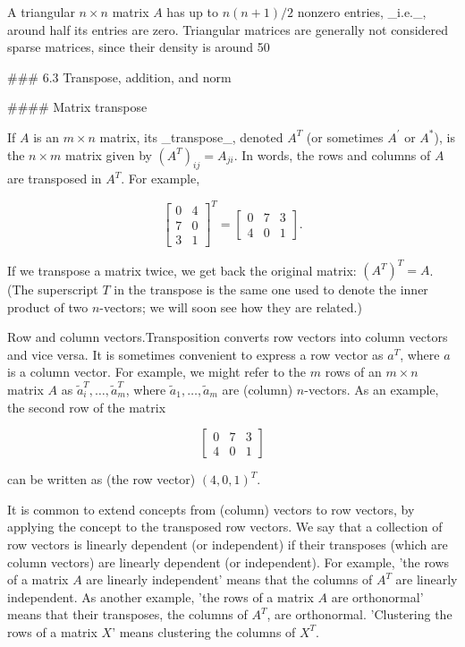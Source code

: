 A triangular \(n\times n\) matrix \(A\) has up to \(n(n+1)/2\) nonzero entries, _i.e._, around half its entries are zero. Triangular matrices are generally not considered sparse matrices, since their density is around 50%

### 6.3 Transpose, addition, and norm

#### Matrix transpose

If \(A\) is an \(m\times n\) matrix, its _transpose_, denoted \(A^{T}\) (or sometimes \(A^{\prime}\) or \(A^{*}\)), is the \(n\times m\) matrix given by \((A^{T})_{ij}=A_{ji}\). In words, the rows and columns of \(A\) are transposed in \(A^{T}\). For example,

\[\left[\begin{array}{cc}0&4\\ 7&0\\ 3&1\end{array}\right]^{T}=\left[\begin{array}{cc}0&7&3\\ 4&0&1\end{array}\right].\]

If we transpose a matrix twice, we get back the original matrix: \((A^{T})^{T}=A\). (The superscript \(T\) in the transpose is the same one used to denote the inner product of two \(n\)-vectors; we will soon see how they are related.)

Row and column vectors.Transposition converts row vectors into column vectors and vice versa. It is sometimes convenient to express a row vector as \(a^{T}\), where \(a\) is a column vector. For example, we might refer to the \(m\) rows of an \(m\times n\) matrix \(A\) as \(\tilde{a}_{i}^{T},\ldots,\tilde{a}_{m}^{T}\), where \(\tilde{a}_{1},\ldots,\tilde{a}_{m}\) are (column) \(n\)-vectors. As an example, the second row of the matrix

\[\left[\begin{array}{ccc}0&7&3\\ 4&0&1\end{array}\right]\]

can be written as (the row vector) \((4,0,1)^{T}\).

It is common to extend concepts from (column) vectors to row vectors, by applying the concept to the transposed row vectors. We say that a collection of row vectors is linearly dependent (or independent) if their transposes (which are column vectors) are linearly dependent (or independent). For example, 'the rows of a matrix \(A\) are linearly independent' means that the columns of \(A^{T}\) are linearly independent. As another example, 'the rows of a matrix \(A\) are orthonormal' means that their transposes, the columns of \(A^{T}\), are orthonormal. 'Clustering the rows of a matrix \(X\)' means clustering the columns of \(X^{T}\).

